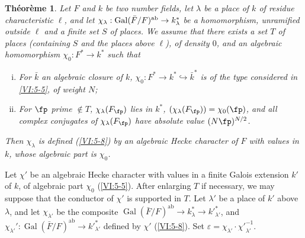 \documentclass[oneside]{book}
\DeclareMathOperator{\gal}{Gal}
\newcounter{char}
\theoremstyle{sga-source}
\theoremstyle{sga-source-dash}
\theoremstyle{sga-source-dotdash}
\theoremstyle{sga-source-number-note-dash}
\theoremstyle{sga-source-note-number-dotdash}
\theoremstyle{sga-source-example-dotdash}
\theoremstyle{sga-source-inline-number}
\theoremstyle{sga-source-bare-number}
\theoremstyle{sga-source}
\newtheorem{theorem_}[subsection]{Théorème}
\newcommand{\PrintPage}[1]{}\newcommand{\MathPage}[1]{}\newcommand{\PrintCite}[2]{#1}\newcommand{\var}[3]{#2}
\begin{document}
\begin{theorem_}\label{VI:5-10}
Let $F$ and $k$ be two number fields, let $\lambda$ be a place of $k$ of 
residue characteristic $\ell$, and let 
$\chi_\lambda:\gal(\bar F/F)^\textnormal{ab}\to k_\lambda^\ast$ be a 
homomorphism, unramified outside $\ell$ and a finite set $S$ of 
places. We assume that there exists a set $T$ of places (containing $S$ and the 
places above $\ell$), of density $0$, and an algebraic homomorphism 
$\chi_0:F^\ast \to k^\ast$ such that 
\begin{enumerate}[(i)]
  \item For $\bar k$ an algebraic closure of $k$, 
    $\chi_0:F^\ast \to k^\ast \hookrightarrow \bar k^\ast$ is of the type 
    considered in \ref{VI:5-5}, of weight $N$; 
  \PrintPage{212}
\item For $\fp$ prime $\notin T$, $\chi_\lambda(F_\fp)$ lies in 
    $k^\ast$, $(\chi_\lambda(F_\fp))=\chi_0(\fp)$, and all complex conjugates 
    of $\chi_\lambda(F_\fp)$ have absolute value $(N \fp)^{N/2}$. 
\end{enumerate}

Then $\chi_\lambda$ is defined (\ref{VI:5-8}) by an algebraic Hecke character 
of $F$ with values in $k$, whose algebraic part is $\chi_0$. 
\end{theorem_}

Let $\chi'$ be an algebraic Hecke character with values in a 
finite Galois extension $k'$ of $k$, of algebraic part $\chi_0$ 
(\ref{VI:5-5}). After enlarging $T$ if necessary, we may suppose that the conductor of 
$\chi'$ is supported in $T$. Let $\lambda'$ be a place of $k'$ above 
$\lambda$, and let $\chi_{\lambda'}$ be the composite 
$\gal(\bar F/F)^\text{ab}\to k_\lambda^\ast \to {k'}_{\lambda'}^\ast$, and 
$\chi_{\lambda'}':\gal(\bar F/F)^\text{ab}\to {k'}_{\lambda'}^\ast$ defined 
by $\chi'$ (\ref{VI:5-8}). Set 
$\varepsilon = \chi_{\lambda'} \cdot {\chi'}_{\lambda'}^{-1}$.
\end{document}
